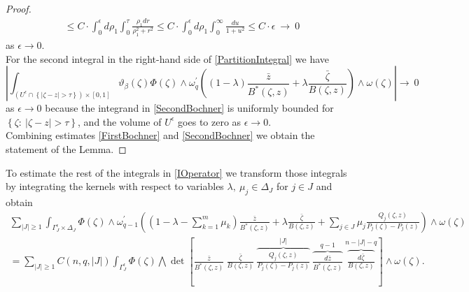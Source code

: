 \documentclass[11pt,reqno]{amsart}
\numberwithin{equation}{section}
\begin{document}
\begin{proof}
\begin{multline}
\leq C\cdot\int_0^{\epsilon}d\rho_1\int_0^{\tau}\frac{\rho_1dr}{\rho_1^2+r^2}
\leq C\cdot\int_0^{\epsilon}d\rho_1\int_0^{\infty}\frac{du}{1+u^2}\leq C\cdot\epsilon\
\rightarrow\ 0
\end{multline}
as $\epsilon\to 0$.\\
\indent
For the second integral in the right-hand side of \eqref{PartitionIntegral} we have
\begin{equation}\label{SecondBochner}
\left|\int_{\left(U^{\epsilon}\cap\left\{|\zeta-z|>\tau\right\}\right)\times[0,1]}
\vartheta_{\beta}(\zeta)\Phi(\zeta)
\wedge\omega^{\prime}_{q}\left((1-\lambda)\frac{\bar z}{B^*(\zeta,z)}
+\lambda\frac{\bar\zeta}{B(\zeta,z)}\right)\wedge\omega(\zeta)\right|\rightarrow\ 0
\end{equation}
as $\epsilon\to 0$ because the integrand in \eqref{SecondBochner} is uniformly bounded for
$\left\{\zeta:\ |\zeta - z|>\tau\right\}$,
and the volume of $U^{\epsilon}$ goes to zero as $\epsilon\to 0$.\\
\indent
Combining estimates \eqref{FirstBochner} and \eqref{SecondBochner} we obtain the statement
of the Lemma.
\end{proof}

\indent
To estimate the rest of the integrals in \eqref{IOperator} we transform those integrals
by integrating the kernels with respect to variables $\lambda,\ \mu_j \in \Delta_J$ for $j\in J$
and obtain
\begin{multline}\label{IDeterminants}
\sum_{|J|\geq 1}\int_{\Gamma^{\epsilon}_J\times\Delta_J}
\Phi(\zeta)\wedge \omega^{\prime}_{q-1}\left((1-\lambda-\sum_{k=1}^m\mu_k)
\frac{\bar z}{B^*(\zeta,z)}
+\lambda\frac{\bar\zeta}{B(\zeta,z)}
+\sum_{j\in J}\mu_j\frac{Q_j(\zeta,z)}{P_j(\zeta)-P_j(z)}\right)
\wedge\omega(\zeta)\\
=\sum_{|J|\geq 1}C(n,q,|J|)\int_{\Gamma^{\epsilon}_J}\Phi(\zeta)
\bigwedge\det\left[\frac{\bar z}{B^*(\zeta,z)}\ \frac{\bar\zeta}{B(\zeta,z)}\
\overbrace{\frac{Q_j(\zeta,z)}{P_j(\zeta)-P_j(z)}}^{|J|}\
\overbrace{\frac{d{\bar z}}{B^*(\zeta,z)}}^{q-1}\
\overbrace{\frac{d{\bar\zeta}}{B(\zeta,z)}}^{n-|J|-q}\right]
\wedge\omega(\zeta).
\end{multline}
\end{document}
